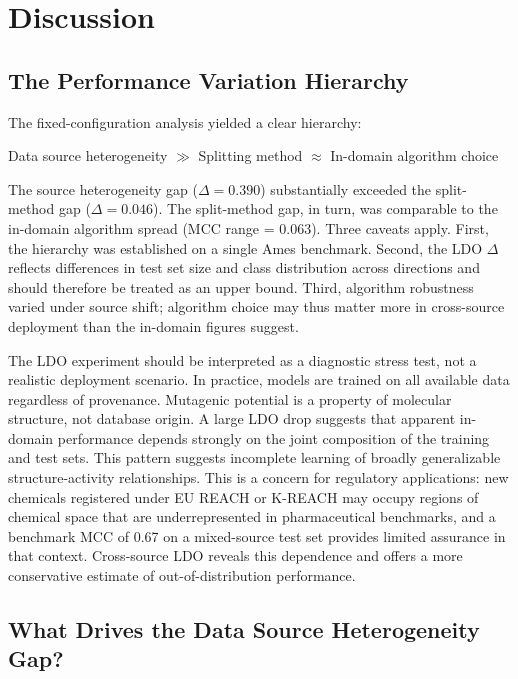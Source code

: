 \section{Discussion}

\subsection{The Performance Variation Hierarchy}

The fixed-configuration analysis yielded a clear hierarchy:

\begin{center}
Data source heterogeneity $\gg$ Splitting method $\approx$ In-domain algorithm choice
\end{center}

The source heterogeneity gap ($\Delta = 0.390$) substantially exceeded the 
split-method gap ($\Delta = 0.046$). The split-method gap, in turn, was comparable 
to the in-domain algorithm spread (MCC range = 0.063). Three caveats apply. First, the 
hierarchy was established on a single Ames benchmark. Second, the LDO $\Delta$ reflects 
differences in test set size and class distribution across directions and should therefore 
be treated as an upper bound. Third, algorithm robustness varied under source shift; 
algorithm choice may thus matter more in cross-source deployment than the in-domain 
figures suggest.

The LDO experiment should be interpreted as a diagnostic stress test, not a realistic 
deployment scenario. In practice, models are trained on all available data regardless of 
provenance. Mutagenic potential is a property of molecular structure, not database origin. 
A large LDO drop suggests that apparent in-domain performance depends strongly on the 
joint composition of the training and test sets. This pattern suggests incomplete learning 
of broadly generalizable structure-activity relationships. 
This is a concern for regulatory applications: new chemicals registered under EU REACH or 
K-REACH may occupy regions of chemical space that are underrepresented in pharmaceutical 
benchmarks, and a benchmark MCC of 0.67 on a mixed-source test set provides limited 
assurance in that context. Cross-source LDO reveals this dependence and offers a more 
conservative estimate of out-of-distribution performance.

\subsection{What Drives the Data Source Heterogeneity Gap?}

